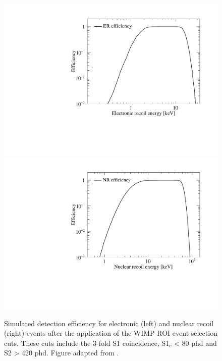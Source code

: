 %
\begin{figure}[b]
    \centering
    \includegraphics[scale=0.39]{Chapter_5/Figures/er_efficiency.pdf}
    \includegraphics[scale=0.39]{Chapter_5/Figures/nr_efficiency.pdf}
    \caption[Simulated detection efficiency for electronic (left) and nuclear recoil (right) events after the application of the WIMP ROI event selection cuts.]%
    {Simulated detection efficiency for electronic (left) and nuclear recoil (right) events after the application of the WIMP ROI event selection cuts. These cuts include the 3-fold S1 coincidence, S1$_{c}$ < 80 phd and S2 > 420 phd. Figure adapted from \cite{akerib2018projected}.}
    \label{fig:lz_er_nr_efficiency}
\end{figure}
%


